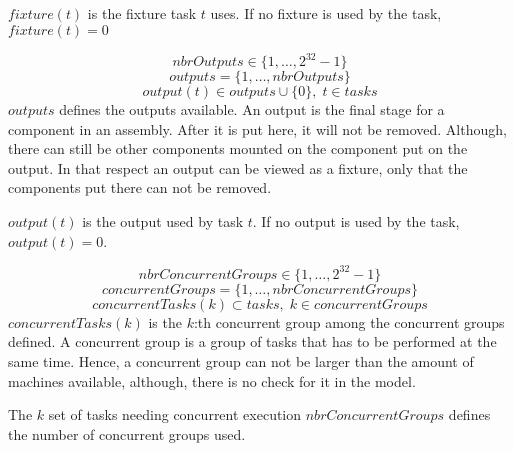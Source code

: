  $fixture(t)$ is the fixture task $t$ uses. If no fixture is used by the task, $fixture(t) = 0$
 
 \begin{equation}\label{eq:7}
 nbrOutputs \in \{1 , \ldots , 2^{32}-1\}
 \end{equation}
 \begin{equation}\label{eq:16}
 outputs = \{1 , \ldots , nbrOutputs\}
 \end{equation}
 \begin{equation}\label{eq:23}
 output(t) \in outputs \cup \{0\}, \; t \in tasks
 \end{equation}
 $outputs$ defines the outputs available. An output is the final stage for a component in an assembly. After it is put here, it will not be removed. Although, there can still be other components mounted on the component put on the output. In that respect an output can be viewed as a fixture, only that the components put there can not be removed.
 
 $output(t)$ is the output used by task $t$. If no output is used by the task, $output(t) = 0$.
 
 
 \begin{equation}\label{eq:8}
 nbrConcurrentGroups \in \{1 , \ldots , 2^{32}-1\}
 \end{equation}
 \begin{equation}\label{eq:17}
 concurrentGroups = \{1 , \ldots , nbrConcurrentGroups\}
 \end{equation}
 \begin{equation}\label{eq:30}
 concurrentTasks(k) \subset tasks, \; k \in concurrentGroups
 \end{equation}
 $concurrentTasks(k)$ is the $k$:th concurrent group among the concurrent groups defined. A concurrent group is a group of tasks that has to be performed at the same time. Hence, a concurrent group can not be larger than the amount of machines available, although, there is no check for it in the model. 
 
 The $k$ set of tasks needing concurrent execution
 $nbrConcurrentGroups$ defines the number of concurrent groups used. 
 
